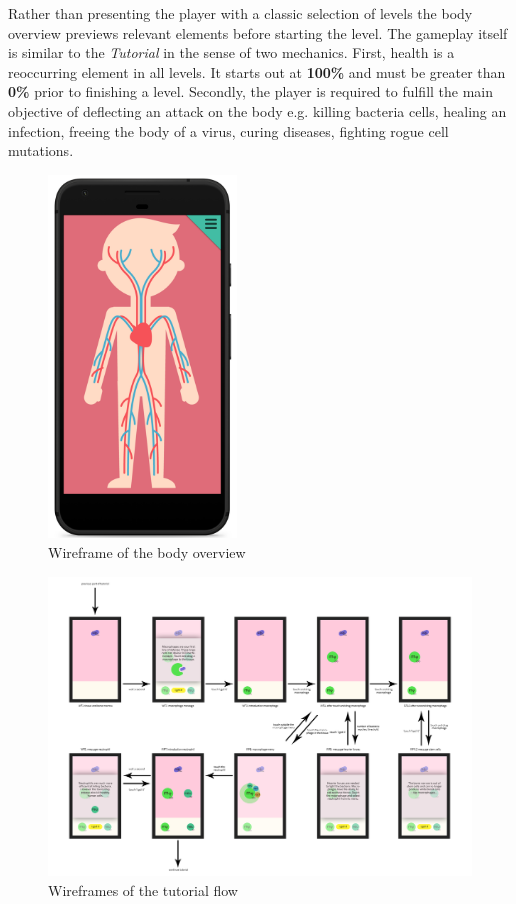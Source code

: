Rather than presenting the player with a classic selection of levels the body overview previews relevant elements before starting the level. The gameplay itself is similar to the \textit{Tutorial} in the sense of two mechanics. First, health is a reoccurring element in all levels. It starts out at \textbf{100\%} and must be greater than \textbf{0\%} prior to finishing a level. Secondly, the player is required to fulfill the main objective of deflecting an attack on the body e.g. killing bacteria cells, healing an infection, freeing the body of a virus, curing diseases, fighting rogue cell mutations.

\begin{figure}
  \includegraphics[width=5cm]{assets/wireframe_body.png}
  \caption{Wireframe of the body overview}
  \centering
  \label{fig_body}
\end{figure}

\newpage

\begin{figure}
  \includegraphics[width=21cm,angle=90,keepaspectratio]{assets/combinedwireframes.jpg}
  \caption{Wireframes of the tutorial flow}
  \label{fig_tutorial_wireframes}
\end{figure}

